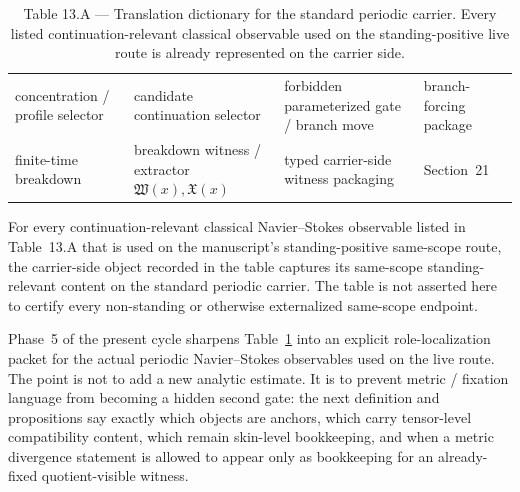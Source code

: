 \begin{table}[t]
\begin{tabular}{>{\raggedright\arraybackslash}p{} >{\raggedright\arraybackslash}p{} >{\raggedright\arraybackslash}p{} >{\raggedright\arraybackslash}p{}}
\addlinespace
concentration / profile selector & candidate continuation selector & forbidden parameterized gate / branch move & branch-forcing package \\
\addlinespace
finite-time breakdown & breakdown witness / extractor $\mathfrak W(x),\mathfrak X(x)$ & typed carrier-side witness packaging & Section~21 \\
\bottomrule
\end{tabular}
\caption{Table 13.A --- Translation dictionary for the standard periodic carrier. Every listed continuation-relevant classical observable used on the standing-positive live route is already represented on the carrier side.}
\label{tab:translation-dictionary-standard-carrier}
\end{table}

\label{cor:row-by-row-continuation-completeness}
\begin{tcolorbox}[title={Corollary 13.23A (Row-by-row verification of strong continuation-completeness)}, colback=blue!2!white, colframe=blue!55!black]
For every continuation-relevant classical Navier--Stokes observable listed in Table~13.A that is used on the manuscript's standing-positive same-scope route, the carrier-side object recorded in the table captures its same-scope standing-relevant content on the standard periodic carrier. The table is not asserted here to certify every non-standing or otherwise externalized same-scope endpoint.


\end{tcolorbox}

Phase~5 of the present cycle sharpens Table~\ref{tab:translation-dictionary-standard-carrier} into an explicit role-localization packet for the actual periodic Navier--Stokes observables used on the live route. The point is not to add a new analytic estimate. It is to prevent metric / fixation language from becoming a hidden second gate: the next definition and propositions say exactly which objects are anchors, which carry tensor-level compatibility content, which remain skin-level bookkeeping, and when a metric divergence statement is allowed to appear only as bookkeeping for an already-fixed quotient-visible witness.

